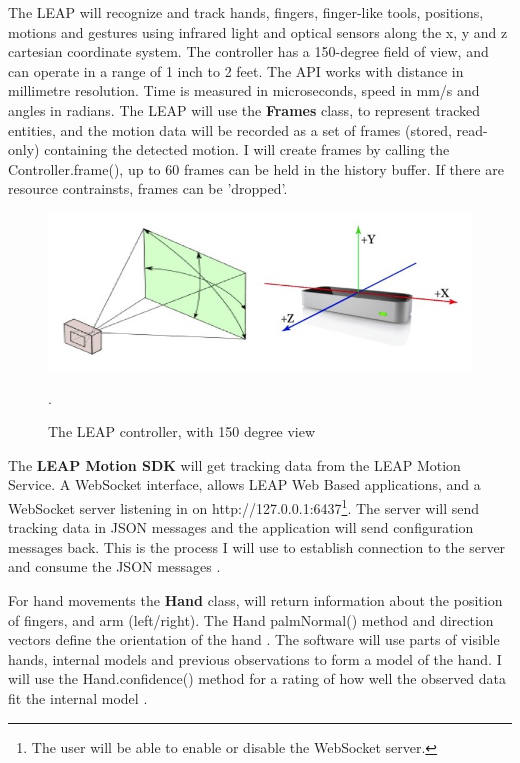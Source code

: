 \documentclass[a4paper, 10pt]{article}
\begin{document}
The LEAP will recognize and track hands, fingers, finger-like tools, positions, motions and gestures using infrared light and optical sensors along the x, y and z cartesian coordinate system. The controller has a 150-degree field of view, and can operate in a range of 1 inch to 2 feet. The API works with distance in millimetre resolution. Time is measured in microseconds, speed in mm/s and angles in radians. The LEAP will use the \textbf{Frames} class, to represent tracked entities, and the motion data will be recorded as a set of frames (stored, read-only) containing the detected motion. I will create frames by calling the Controller.frame(), up to 60 frames can be held in the history buffer. If there are resource contrainsts, frames can be 'dropped'.

\begin{figure}[H]
\begin{center}
\includegraphics[scale=0.4]{leap}\\
\caption{The LEAP controller, with 150 degree view \cite{leap}}.
\end{center}
\end{figure}

The \textbf{LEAP Motion SDK} will get tracking data from the LEAP Motion Service. A WebSocket interface, allows LEAP Web Based applications, and a WebSocket server listening in on http://127.0.0.1:6437\footnote{The user will be able to enable or disable the WebSocket server.}. The server will send tracking data in JSON messages and the application will send configuration messages back. This is the process I will use to establish connection to the server and consume the JSON messages \cite{leap}. 

For hand movements the \textbf{Hand} class, will return information about the position of fingers, and arm (left/right). The Hand palmNormal() method and direction vectors define the orientation of the hand \cite{leap}. The software will use parts of visible hands, internal models and previous observations to form a model of the hand. I will use the Hand.confidence() method for a rating of how well the observed data fit the internal model \cite{leap}.
\end{document}
